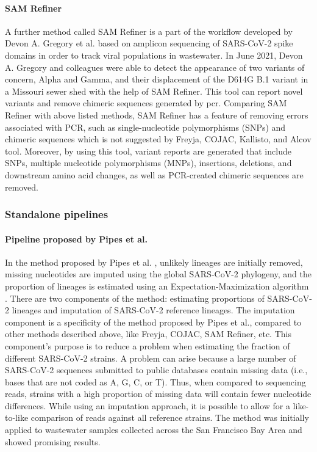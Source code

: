         \paragraph{SAM Refiner}
        A further method called SAM Refiner is a part of the workflow developed by Devon A. Gregory et al. \cite{gregory2021} based on amplicon sequencing of SARS-CoV-2 spike domains in order to track viral populations in wastewater. In June 2021, Devon A. Gregory and colleagues were able to detect the appearance of two variants of concern, Alpha and Gamma, and their displacement of the D614G B.1 variant in a Missouri sewer shed with the help of SAM Refiner. This tool can report novel variants and remove chimeric sequences generated by \acrshort{pcr}. Comparing SAM Refiner with above listed methods, SAM Refiner has a feature of removing errors associated with PCR, such as single-nucleotide polymorphisms (SNPs) and chimeric sequences which is not suggested by Freyja, COJAC, Kallisto, and Alcov tool. Moreover, by using this tool, variant reports are generated that include SNPs, multiple nucleotide polymorphisms (MNPs), insertions, deletions, and downstream amino acid changes, as well as PCR-created chimeric sequences are removed. 
        
        \subsubsection{Standalone pipelines} \label{sec:prior:methods:pipelines}
        \paragraph{Pipeline proposed by Pipes et al.}
        In the method proposed by Pipes et al. \cite{pipes2022}, unlikely lineages are initially removed, missing nucleotides are imputed using the global SARS-CoV-2 phylogeny, and the proportion of lineages is estimated using an Expectation-Maximization algorithm \cite{dempster1977}. There are two components of the method: estimating proportions of SARS-CoV-2 lineages and imputation of SARS-CoV-2 reference lineages. The imputation component is a specificity of the method proposed by Pipes et al., compared to other methods described above, like Freyja, COJAC, SAM Refiner, etc. This component's purpose is to reduce a problem when estimating the fraction of different SARS-CoV-2 strains. A problem can arise because a large number of SARS-CoV-2 sequences submitted to public databases contain missing data (i.e., bases that are not coded as A, G, C, or T). Thus, when compared to sequencing reads, strains with a high proportion of missing data will contain fewer nucleotide differences. While using an imputation approach, it is possible to allow for a like-to-like comparison of reads against all reference strains. The method was initially applied to wastewater samples collected across the San Francisco Bay Area and showed promising results.
